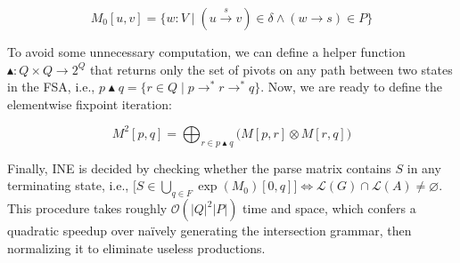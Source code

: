 \begin{equation}
M_0[u, v] = \{w : V \mid (u \overset{s}{\rightarrow} v) \in \delta \land (w \rightarrow s) \in P \}
\end{equation}

To avoid some unnecessary computation, we can define a helper function $\blacktriangle: Q \times Q \rightarrow 2^Q$ that returns only the set of pivots on any path between two states in the FSA, i.e., $p\blacktriangle q = \{r \in Q \mid p \rightarrow^* r \rightarrow^* q \}$. Now, we are ready to define the elementwise fixpoint iteration:

\begin{equation}
  M^2[p, q] = \bigoplus_{r \in p \blacktriangle q} \big(M[p, r] \otimes M[r, q]\big)
\end{equation}

Finally, INE is decided by checking whether the parse matrix contains $S$ in any terminating state, i.e., $\big[S \in \bigcup_{q \in F}\exp(M_0)[0, q]\big] \Longleftrightarrow \mathcal{L}(G) \cap \mathcal{L}(A) \neq \varnothing$. This procedure takes roughly $\mathcal{O}(|Q|^2|P|)$ time and space, which confers a quadratic speedup over na\"ively generating the intersection grammar, then normalizing it to eliminate useless productions.

\clearpage



